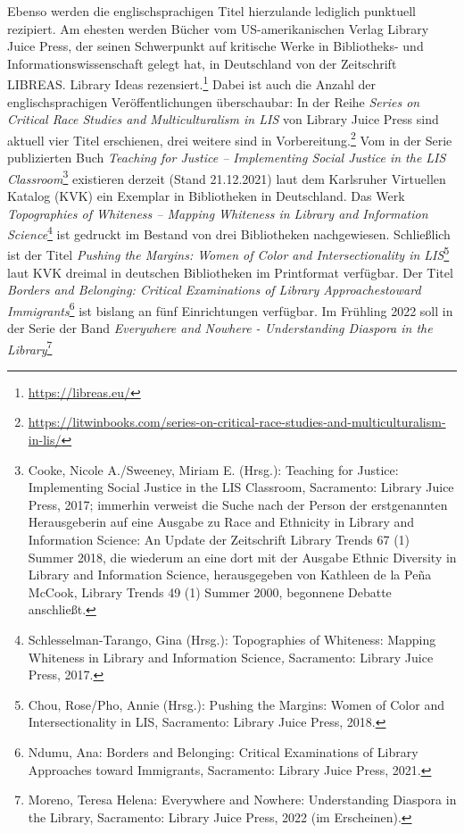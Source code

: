 \documentclass[a4paper,
fontsize=11pt,
oneside,
numbers=noperiodatend,
parskip=half-,
bibliography=totoc,
final
]{scrartcl}
\begin{document}
Ebenso werden die englischsprachigen Titel hierzulande lediglich
punktuell rezipiert. Am ehesten werden Bücher vom US-amerikanischen
Verlag Library Juice Press, der seinen Schwerpunkt auf kritische Werke
in Bibliotheks- und Informationswissenschaft gelegt hat, in Deutschland
von der Zeitschrift LIBREAS. Library Ideas rezensiert.\footnote{\url{https://libreas.eu/}}
Dabei ist auch die Anzahl der englischsprachigen Veröffentlichungen
überschaubar: In der Reihe \emph{Series on Critical Race Studies and
Multiculturalism in LIS} von Library Juice Press sind aktuell vier Titel
erschienen, drei weitere sind in Vorbereitung.\footnote{\url{https://litwinbooks.com/series-on-critical-race-studies-and-multiculturalism-in-lis/}}
Vom in der Serie publizierten Buch \emph{Teaching for Justice --
Implementing Social Justice in the LIS Classroom}\footnote{Cooke, Nicole
  A./Sweeney, Miriam E. (Hrsg.): Teaching for Justice: Implementing
  Social Justice in the LIS Classroom, Sacramento: Library Juice Press,
  2017; immerhin verweist die Suche nach der Person der erstgenannten
  Herausgeberin auf eine Ausgabe zu Race and Ethnicity in Library and
  Information Science: An Update der Zeitschrift Library Trends 67 (1)
  Summer 2018, die wiederum an eine dort mit der Ausgabe Ethnic
  Diversity in Library and Information Science, herausgegeben von
  Kathleen de la Peña McCook, Library Trends 49 (1) Summer 2000,
  begonnene Debatte anschließt.} existieren derzeit (Stand 21.12.2021)
laut dem Karlsruher Virtuellen Katalog (KVK) ein Exemplar in
Bibliotheken in Deutschland. Das Werk \emph{Topographies of Whiteness --
Mapping Whiteness in Library and Information Science}\footnote{Schlesselman-Tarango,
  Gina (Hrsg.): Topographies of Whiteness: Mapping Whiteness in Library
  and Information Science\emph{,} Sacramento: Library Juice Press, 2017.}
ist gedruckt im Bestand von drei Bibliotheken nachgewiesen. Schließlich
ist der Titel \emph{Pushing the Margins: Women of Color and
Intersectionality in LIS}\footnote{Chou, Rose/Pho, Annie (Hrsg.):
  Pushing the Margins: Women of Color and Intersectionality in LIS,
  Sacramento: Library Juice Press, 2018.} laut KVK dreimal in deutschen
Bibliotheken im Printformat verfügbar. Der Titel \emph{Borders and
Belonging: Critical Examinations of Library Approachestoward
Immigrants}\footnote{Ndumu, Ana: Borders and Belonging: Critical
  Examinations of Library Approaches toward Immigrants, Sacramento:
  Library Juice Press, 2021.} ist bislang an fünf Einrichtungen
verfügbar. Im Frühling 2022 soll in der Serie der Band \emph{Everywhere
and Nowhere - Understanding Diaspora in the Library}\footnote{Moreno,
  Teresa Helena: Everywhere and Nowhere: Understanding Diaspora in the
  Library, Sacramento: Library Juice Press, 2022 (im Erscheinen).}
\end{document}
